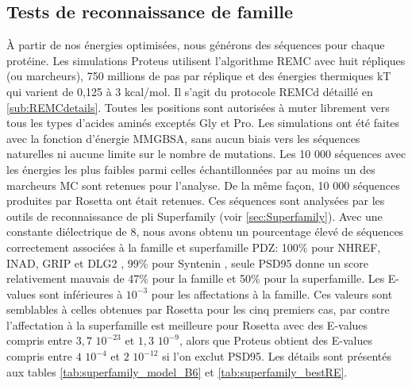 \subsection{Tests de reconnaissance de famille}
À partir de nos énergies optimisées, nous générons des séquences pour chaque protéine. Les simulations Proteus utilisent l'algorithme REMC avec huit répliques (ou marcheurs), 750 millions de pas par réplique et des énergies thermiques kT  qui varient de 0,125 à 3 kcal/mol. Il s'agit du protocole REMCd détaillé en \ref{sub:REMCdetails}. Toutes les positions sont autorisées à muter librement vers tous les types d'acides aminés exceptés Gly et Pro. Les simulations ont été faites avec la fonction d'énergie MMGBSA, sans aucun biais vers les séquences naturelles ni aucune limite sur le nombre de mutations. Les 10 000 séquences avec les énergies les plus faibles parmi celles échantillonnées par au moins un des marcheurs MC sont retenues pour l'analyse. De la même façon, 10 000 séquences produites par Rosetta ont était retenues. Ces séquences sont analysées par les outils de reconnaissance de pli \og Superfamily \fg (voir \ref{sec:Superfamily}). Avec une constante diélectrique de 8, nous avons obtenu un pourcentage élevé de séquences correctement associées à la famille et superfamille PDZ: 100\% pour NHREF, INAD, GRIP et DLG2 , 99\%  pour Syntenin , seule PSD95 donne un score relativement mauvais de 47\% pour la famille et 50\% pour la superfamille. Les E-values sont inférieures à $10^{-3}$ pour les affectations à la famille. Ces valeurs sont semblables à celles obtenues par Rosetta pour les cinq premiers cas, par contre l'affectation à la superfamille est meilleure pour Rosetta avec des E-values compris entre $3,7$ $10^{-23}$ et $1,3$ $10^{-9}$, alors que Proteus obtient des E-values compris entre $4$ $10^{-4}$ et $2$ $10^{-12}$ si l'on exclut PSD95. Les détails sont présentés aux tables \ref{tab:superfamily_model_B6} et \ref{tab:superfamily_bestRE}.


